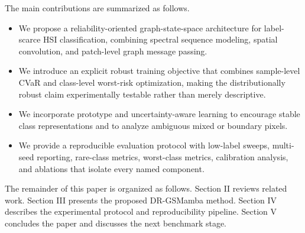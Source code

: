 The main contributions are summarized as follows.
\begin{itemize}
\item We propose a reliability-oriented graph-state-space architecture for label-scarce HSI classification, combining spectral sequence modeling, spatial convolution, and patch-level graph message passing.
\item We introduce an explicit robust training objective that combines sample-level CVaR and class-level worst-risk optimization, making the distributionally robust claim experimentally testable rather than merely descriptive.
\item We incorporate prototype and uncertainty-aware learning to encourage stable class representations and to analyze ambiguous mixed or boundary pixels.
\item We provide a reproducible evaluation protocol with low-label sweeps, multi-seed reporting, rare-class metrics, worst-class metrics, calibration analysis, and ablations that isolate every named component.
\end{itemize}

The remainder of this paper is organized as follows. Section II reviews related work. Section III presents the proposed DR-GSMamba method. Section IV describes the experimental protocol and reproducibility pipeline. Section V concludes the paper and discusses the next benchmark stage.
